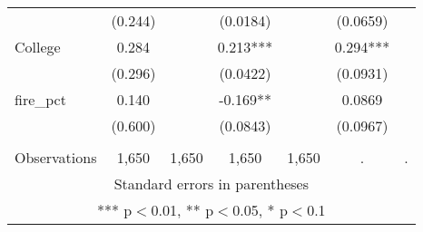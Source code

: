 \begin{tabular}{lcccccc}
 & (0.244) &  & (0.0184) &  & (0.0659) &  \\
College & 0.284 &  & 0.213*** &  & 0.294*** &  \\
 & (0.296) &  & (0.0422) &  & (0.0931) &  \\
fire\_pct & 0.140 &  & -0.169** &  & 0.0869 &  \\
 & (0.600) &  & (0.0843) &  & (0.0967) &  \\
 &  &  &  &  &  &  \\
 Observations & 1,650 & 1,650 & 1,650 & 1,650 & . & . \\ \hline
\multicolumn{7}{c}{ Standard errors in parentheses} \\
\multicolumn{7}{c}{ *** p$<$0.01, ** p$<$0.05, * p$<$0.1} \\
\end{tabular}
